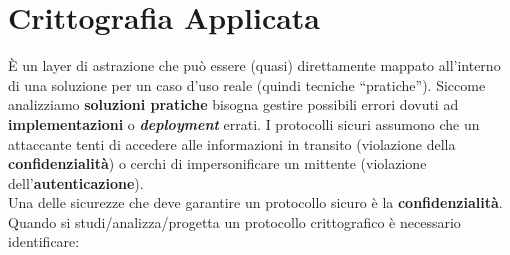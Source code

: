 \newpage
\section{Crittografia Applicata}
È un layer di astrazione che può essere (quasi) direttamente mappato all'interno di una soluzione per un caso d'uso reale (quindi tecniche ``pratiche''). Siccome analizziamo \textbf{soluzioni pratiche} bisogna gestire possibili errori dovuti ad \textbf{implementazioni} o \textbf{\textit{deployment}} errati. I protocolli sicuri assumono che un attaccante tenti di accedere alle informazioni in transito (violazione della \textbf{confidenzialità}) o cerchi di impersonificare un mittente (violazione dell'\textbf{autenticazione}). \\ 
Una delle sicurezze che deve garantire un protocollo sicuro è la \textbf{confidenzialità}. \\ \newline
Quando si studi/analizza/progetta un protocollo crittografico è necessario identificare:
